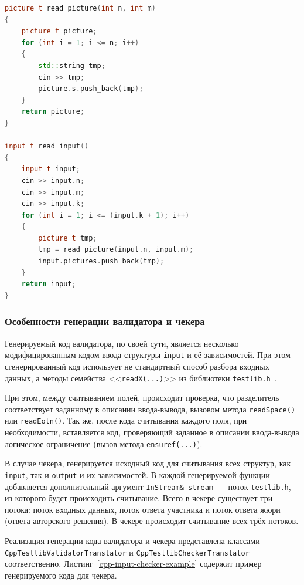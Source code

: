 \documentclass[times,specification,annotation]{style/itmo-student-thesis/itmo-student-thesis}
\begin{document}
\begin{lstlisting}[float=!h,caption={Пример сгенерированного кода ввода},label={cpp-input-example},language=c++]
picture_t read_picture(int n, int m)
{
    picture_t picture;
    for (int i = 1; i <= n; i++)
    {
        std::string tmp;
        cin >> tmp;
        picture.s.push_back(tmp);
    }
    return picture;
}

input_t read_input()
{
    input_t input;
    cin >> input.n;
    cin >> input.m;
    cin >> input.k;
    for (int i = 1; i <= (input.k + 1); i++)
    {
        picture_t tmp;
        tmp = read_picture(input.n, input.m);
        input.pictures.push_back(tmp);
    }
    return input;
}
\end{lstlisting}

\subsubsection{Особенности генерации валидатора и чекера}

Генерируемый код валидатора, по своей сути, является несколько модифицированным кодом ввода структуры \texttt{input} и её зависимостей. При этом сгенерированный код использует не стандартный способ разбора входных данных, а методы семейства <<\texttt{readX(...)}>> из библиотеки \texttt{testlib.h}~\cite{cf-testlib}. 

При этом, между считыванием полей, происходит проверка, что разделитель соответствует заданному в описании ввода-вывода, вызовом метода \texttt{readSpace()} или \texttt{readEoln()}. Так же, после кода считывания каждого поля, при необходимости, вставляется код, проверяющий заданное в описании ввода-вывода логическое ограничение (вызов метода \texttt{ensuref(...)}).

В случае чекера, генерируется исходный код для считывания всех структур, как \texttt{input}, так и \texttt{output} и их зависимостей. В каждой генерируемой функции добавляется дополнительный аргумент \texttt{InStream\& stream}~--- поток \texttt{testlib.h}, из которого будет происходить считывание. Всего в чекере существует три потока: поток входных данных, поток ответа участника и поток ответа жюри (ответа авторского решения). В чекере происходит считывание всех трёх потоков.

Реализация генерации кода валидатора и чекера представлена классами \texttt{CppTestlibValidatorTranslator} и \texttt{CppTestlibCheckerTranslator} соответственно. Листинг~\ref{cpp-input-checker-example} содержит пример генерируемого кода для чекера.
\end{document}
